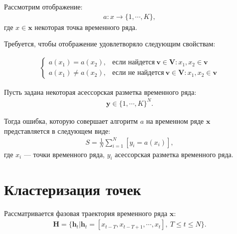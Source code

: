 \documentclass[12pt, twoside]{article}
\numberwithin{equation}{section}
\begin{document}
Рассмотрим отображение:
\begin{equation}
\label{eq:st:4}
\begin{aligned}
a : x \to \{1,\cdots, K\}, 
\end{aligned}
\end{equation}
где $x \in \textbf{x}$ некоторая точка временного ряда.

Требуется, чтобы отображение удовлетворяло следующим свойствам:

\begin{equation}
\label{eq:st:5}
\begin{aligned}
\begin{cases}
    a\left(x_1\right) = a\left(x_2\right), & \text{если найдется}~\textbf{v} \in \mathbf{V}: x_1,x_2 \in \textbf{v}\\
    a\left(x_1\right) \not= a\left(x_2\right), & \text{если не найдется}~\textbf{v} \in \mathbf{V}: x_1,x_2 \in \textbf{v}
\end{cases}
\end{aligned}
\end{equation}

Пусть задана некоторая асессорская разметка временного ряда:
\begin{equation}
\label{eq:st:6}
\begin{aligned}
\textbf{y} \in \{1,\cdots,K\}^{N}.
\end{aligned}
\end{equation}

Тогда ошибка, которую совершает алгоритм $a$ на временном ряде $\textbf{x}$ представляется в следующем виде:
\begin{equation}
\label{eq:st:7}
\begin{aligned}
S = \frac{1}{N}\sum_{i=1}^{N}[y_i = a\left(x_i\right)],
\end{aligned}
\end{equation}
где $x_i$ --- точки временного ряда,  $y_i$ асессорская разметка временного ряда.

\section{Кластеризация точек}
Рассматривается фазовая траектория временного ряда $\textbf{x}$:
\begin{equation}
\label{eq:cl:1}
\begin{aligned}
\mathbf{H} = \{\textbf{h}_t| \textbf{h}_t = [x_{t-T}, x_{t-T+1}, \cdots, x_{t}],~T\leq t\leq N\}.
\end{aligned}
\end{equation}
\end{document}

